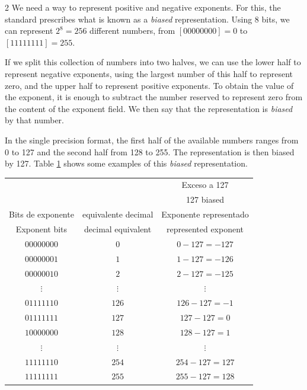 \begin{paracol}{2}
 We need a way to represent positive and negative exponents. For this, the standard prescribes what is known as a \emph{biased} representation. Using 8 bits, we can represent $2^8 = 256$ different numbers, from $[00000000] = 0$ to $[11111111] = 255$.

If we split this collection of numbers into two halves, we can use the lower half to represent negative exponents, using the largest number of this half to represent zero, and the upper half to represent positive exponents. To obtain the value of the exponent, it is enough to subtract the number reserved to represent zero from the content of the exponent field. We then say that the representation is \emph{biased} by that number.

In the single precision format, the first half of the available numbers ranges from 0 to 127 and the second half from 128 to 255. The representation is then biased by 127. Table \ref{tabex} shows some examples of this \emph{biased} representation.
\end{paracol}

\begin{table}
\centering
\begin{tabular}{ccc}
&&Exceso a 127\\
&& 127 biased\\
\hline
Bits de exponente&equivalente decimal&Exponente representado\\
Exponent bits&decimal equivalent&represented exponent\\
\hline
$00000000$&$0$&$0-127=-127$\\
\hline
$00000001$&$1$&$1-127=-126$\\
\hline
$00000010$&$2$&$2-127=-125$\\
\hline
$\vdots$&$\vdots$&$\vdots$\\
\hline
$01111110$&$126$&$126-127=-1$\\
\hline
$01111111$&$127$&$127-127=0$\\
\hline
$10000000$&$128$&$128-127=1$\\
\hline
$\vdots$&$\vdots$&$\vdots$\\
\hline
$11111110$&$254$&$254-127=127$\\
\hline
$11111111$&$255$&$255-127=128$\\
\hline
\end{tabular}
\label{tabex}
\end{table}

